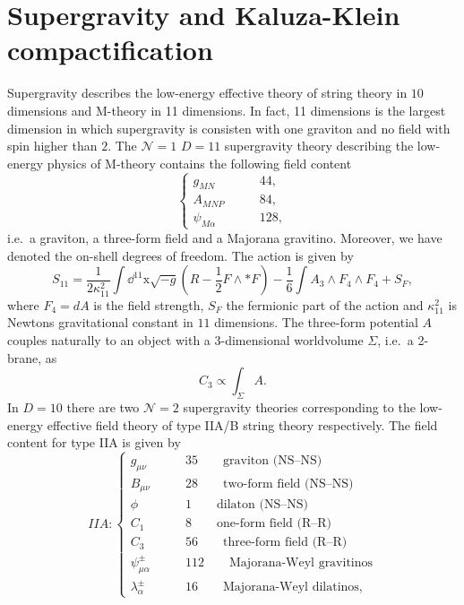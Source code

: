 \section{Supergravity and Kaluza-Klein compactification}
Supergravity describes the low-energy effective theory of string theory in $10$ dimensions and M-theory in 11 dimensions. In fact, 11 dimensions is the largest dimension in which supergravity is consisten with one graviton and no field with spin higher than $2$. The $\mathcal{N}=1$ $D=11$ supergravity theory describing the low-energy physics of M-theory contains the following field content 
\begin{equation}
    \begin{cases}
        g_{MN} \qquad &44,\\
        A_{MNP} \qquad &84,\\
        \psi_{M\alpha} \qquad &128,
    \end{cases}
\end{equation}
i.e.\ a graviton, a three-form field and a Majorana gravitino. Moreover, we have denoted the on-shell degrees of freedom. The action is given by 
\begin{equation}
    S_{11} = \frac{1}{2\kappa_{11}^2}\int\dd^{11}\mathrm{x}\sqrt{-g}\left(R-\frac{1}{2}F\wedge *F\right)-\frac{1}{6}\int A_3 \wedge F_{4}\wedge F_{4}+S_F, 
\end{equation}
where $F_{4}=dA$ is the field strength, $S_F$ the fermionic part of the action and $\kappa_{11}^2$ is Newtons gravitational constant in $11$ dimensions. The three-form potential $A$ couples naturally to an object with a 3-dimensional worldvolume $\Sigma$, i.e.\ a 2-brane, as 
\begin{equation}
    C_3 \propto \int_{\Sigma}A.
\end{equation}
In $D=10$ there are two $\mathcal{N}=2$ supergravity theories corresponding to the low-energy effective field theory of type IIA/B string theory respectively. The field content for type IIA is given by 
\begin{equation*}
    IIA: \begin{cases}
                g_{\mu\nu} \qquad &35 \qquad \text{graviton (NS--NS)}\\
                B_{\mu\nu} \qquad &28 \qquad  \text{two-form field (NS--NS)}\\
                \phi\qquad &1 \qquad  \text{dilaton (NS--NS)}\\
                C_{1}\qquad &8 \qquad  \text{one-form field (R--R)}\\
                C_{3}\qquad &56 \qquad  \text{three-form field  (R--R)}\\
                \psi_{\mu\alpha}^\pm\qquad &112\qquad \text{Majorana-Weyl gravitinos}\\
                \lambda_\alpha^\pm \qquad &16\qquad \text{Majorana-Weyl dilatinos},
          \end{cases}
\end{equation*}
